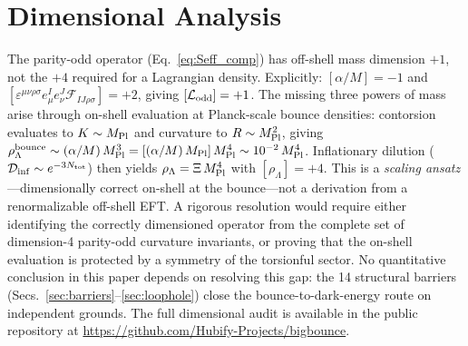 \documentclass[aps,prd,twocolumn,superscriptaddress,showpacs,preprintnumbers,nofootinbib,longbibliography,floatfix]{revtex4-2}
\newcommand{\Dinf}{\mathcal{D}_{\rm inf}}
\newcommand{\MPl}{M_{\rm Pl}}
\begin{document}







\section{Dimensional Analysis}\label{app:dimensions}

The parity-odd operator (Eq.~\ref{eq:Seff_comp}) has off-shell mass dimension $+1$, not the $+4$ required for a Lagrangian density.\label{sec:dimbridge} Explicitly: $[\alpha/M] = -1$ and $[\varepsilon^{\mu\nu\rho\sigma}e^I_\mu e^J_\nu \mathcal{F}_{IJ\rho\sigma}] = +2$, giving $[\mathcal{L}_{\rm odd}] = +1$. The missing three powers of mass arise through on-shell evaluation at Planck-scale bounce densities: contorsion evaluates to $K \sim \MPl$ and curvature to $R \sim \MPl^2$, giving $\rho_\Lambda^{\rm bounce} \sim (\alpha/M)\,\MPl^3 = [(\alpha/M)\,\MPl]\,\MPl^4 \sim 10^{-2}\,\MPl^4$. Inflationary dilution ($\Dinf \sim e^{-3N_{\rm tot}}$) then yields $\rho_\Lambda = \Xi\,\MPl^4$ with $[\rho_\Lambda] = +4$. This is a \textit{scaling ansatz}---dimensionally correct on-shell at the bounce---not a derivation from a renormalizable off-shell EFT. A rigorous resolution would require either identifying the correctly dimensioned operator from the complete set of dimension-4 parity-odd curvature invariants, or proving that the on-shell evaluation is protected by a symmetry of the torsionful sector. No quantitative conclusion in this paper depends on resolving this gap: the 14 structural barriers (Secs.~\ref{sec:barriers}--\ref{sec:loophole}) close the bounce-to-dark-energy route on independent grounds. The full dimensional audit is available in the public repository at \url{https://github.com/Hubify-Projects/bigbounce}.
\end{document}
